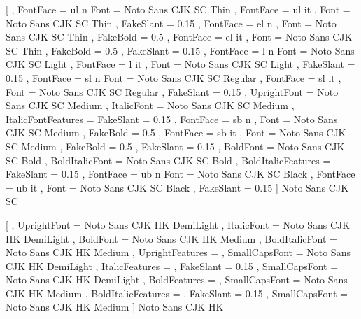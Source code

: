   [
    , FontFace = {ul} {n}  { Font = Noto Sans CJK SC Thin }
    , FontFace = {ul} {it} {
                             , Font      = Noto Sans CJK SC Thin
                             , FakeSlant = 0.15
                           }
    , FontFace = {el} {n}  {
                             , Font      = Noto Sans CJK SC Thin
                             , FakeBold  = 0.5
                           }
    , FontFace = {el} {it} {
                             , Font      = Noto Sans CJK SC Thin
                             , FakeBold  = 0.5
                             , FakeSlant = 0.15
                           }
    , FontFace = {l}  {n}  { Font = Noto Sans CJK SC Light }
    , FontFace = {l}  {it} {
                             , Font      = Noto Sans CJK SC Light
                             , FakeSlant = 0.15
                           }
    , FontFace = {sl} {n}  { Font = Noto Sans CJK SC Regular }
    , FontFace = {sl} {it} {
                             , Font      = Noto Sans CJK SC Regular
                             , FakeSlant = 0.15
                           }
    , UprightFont        = Noto Sans CJK SC Medium
    , ItalicFont         = Noto Sans CJK SC Medium
    , ItalicFontFeatures = { FakeSlant = 0.15 }
    , FontFace = {sb} {n}  {
                             , Font      = Noto Sans CJK SC Medium
                             , FakeBold  = 0.5
                           }
    , FontFace = {sb} {it} {
                             , Font      = Noto Sans CJK SC Medium
                             , FakeBold  = 0.5
                             , FakeSlant = 0.15
                           }
    , BoldFont           = Noto Sans CJK SC Bold
    , BoldItalicFont     = Noto Sans CJK SC Bold
    , BoldItalicFeatures = { FakeSlant = 0.15 }
    , FontFace = {ub} {n} { Font = Noto Sans CJK SC Black }
    , FontFace = {ub} {it} {
                             , Font      = Noto Sans CJK SC Black
                             , FakeSlant = 0.15
                           }
  ]
  {Noto Sans CJK SC}

  [
    , UprightFont        = Noto Sans CJK HK DemiLight
    , ItalicFont         = Noto Sans CJK HK DemiLight
    , BoldFont           = Noto Sans CJK HK Medium
    , BoldItalicFont     = Noto Sans CJK HK Medium
    , UprightFeatures    = {
                             , SmallCapsFont = {Noto Sans CJK HK DemiLight}
                           }
    , ItalicFeatures     = {
                             , FakeSlant     = 0.15
                             , SmallCapsFont = {Noto Sans CJK HK DemiLight}
                           }
    , BoldFeatures       = {
                             , SmallCapsFont = {Noto Sans CJK HK Medium}
                           }
    , BoldItalicFeatures = {
                             , FakeSlant     = 0.15
                             , SmallCapsFont = {Noto Sans CJK HK Medium}
                           }
  ]
  {Noto Sans CJK HK}

